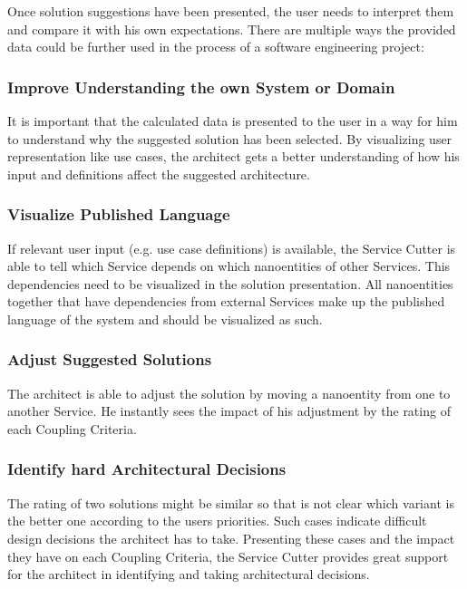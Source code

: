 Once solution suggestions have been presented, the user needs to interpret them and compare it with his own expectations. There are multiple ways the provided data could be further used in the process of a software engineering project:

\subsubsection{Improve Understanding the own System or Domain}

It is important that the calculated data is presented to the user in a way for him to understand why the suggested solution has been selected. By visualizing user representation like use cases, the architect gets a better understanding of how his input and definitions affect the suggested architecture. 

\subsubsection{Visualize Published Language}

If relevant user input (e.g. use case definitions) is available, the Service Cutter is able to tell which Service depends on which nanoentities of other Services. This dependencies need to be visualized in the solution presentation. All nanoentities together that have dependencies from external Services make up the published language of the system and should be visualized as such.

\subsubsection{Adjust Suggested Solutions}

The architect is able to adjust the solution by moving a nanoentity from one to another Service. He instantly sees the impact of his adjustment by the rating of each Coupling Criteria.

\subsubsection{Identify hard Architectural Decisions}

The rating of two solutions might be similar so that is not clear which variant is the better one according to the users priorities. Such cases indicate difficult design decisions the architect has to take. Presenting these cases and the impact they have on each Coupling Criteria, the Service Cutter provides great support for the architect in identifying and taking architectural decisions.

